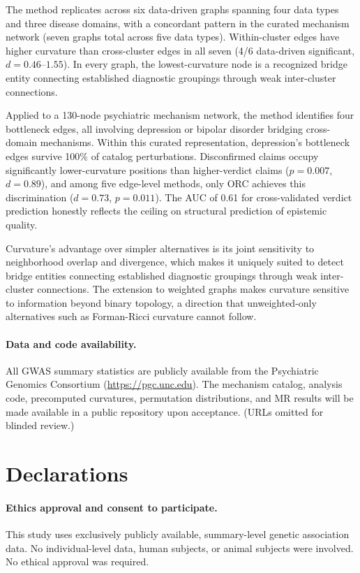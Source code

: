 \documentclass[11pt]{article}
\begin{document}
The method replicates across six data-driven graphs spanning four data types and three disease domains, with a concordant pattern in the curated mechanism network (seven graphs total across five data types). Within-cluster edges have higher curvature than cross-cluster edges in all seven (4/6 data-driven significant, $d = 0.46$--$1.55$). In every graph, the lowest-curvature node is a recognized bridge entity connecting established diagnostic groupings through weak inter-cluster connections.

Applied to a 130-node psychiatric mechanism network, the method identifies four bottleneck edges, all involving depression or bipolar disorder bridging cross-domain mechanisms. Within this curated representation, depression's bottleneck edges survive 100\% of catalog perturbations. Disconfirmed claims occupy significantly lower-curvature positions than higher-verdict claims ($p = 0.007$, $d = 0.89$), and among five edge-level methods, only ORC achieves this discrimination ($d = 0.73$, $p = 0.011$). The AUC of 0.61 for cross-validated verdict prediction honestly reflects the ceiling on structural prediction of epistemic quality.

Curvature's advantage over simpler alternatives is its joint sensitivity to neighborhood overlap and divergence, which makes it uniquely suited to detect bridge entities connecting established diagnostic groupings through weak inter-cluster connections. The extension to weighted graphs makes curvature sensitive to information beyond binary topology, a direction that unweighted-only alternatives such as Forman-Ricci curvature \citep{sreejith2016forman} cannot follow.

\paragraph{Data and code availability.} All GWAS summary statistics are publicly available from the Psychiatric Genomics Consortium (\url{https://pgc.unc.edu}). The mechanism catalog, analysis code, precomputed curvatures, permutation distributions, and MR results will be made available in a public repository upon acceptance. (URLs omitted for blinded review.)

\section*{Declarations}

\paragraph{Ethics approval and consent to participate.}
This study uses exclusively publicly available, summary-level genetic association data. No individual-level data, human subjects, or animal subjects were involved. No ethical approval was required.
\end{document}
